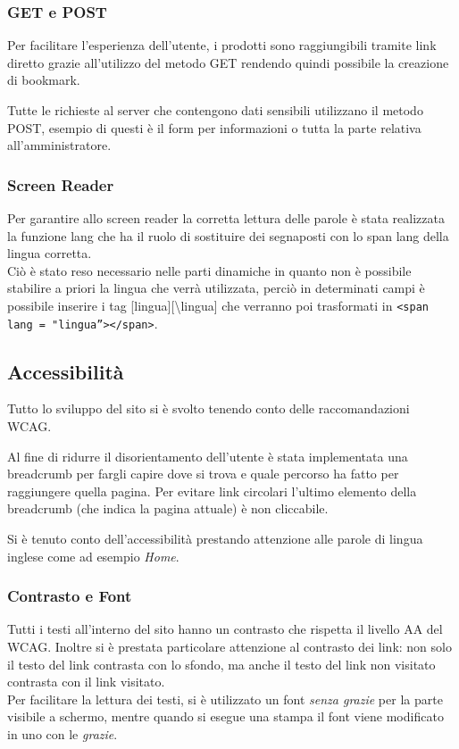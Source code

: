 \documentclass[a4paper, 11pt]{article}
\begin{document}
\subsubsection{GET e POST}
Per facilitare l’esperienza dell’utente, i prodotti sono raggiungibili tramite link diretto grazie all’utilizzo del metodo GET rendendo quindi possibile la creazione di bookmark. 

Tutte le richieste al server che contengono dati sensibili utilizzano il metodo POST, esempio di questi è il form per informazioni o tutta la parte relativa all’amministratore.

\subsubsection{Screen Reader}
Per garantire allo screen reader la corretta lettura delle parole è stata realizzata la funzione lang che ha il ruolo di sostituire dei segnaposti con lo span lang della lingua corretta. \\
Ciò è stato reso necessario nelle parti dinamiche in quanto non è possibile stabilire a priori la lingua che verrà utilizzata, perciò in determinati campi è possibile inserire i tag [lingua][\textbackslash lingua] che verranno poi trasformati in \texttt{<span lang =  "lingua”></span>}.

\pagebreak

\subsection{Accessibilità}

Tutto lo sviluppo del sito si è svolto tenendo conto delle raccomandazioni WCAG. 

Al fine di ridurre il disorientamento dell’utente è stata implementata una breadcrumb per fargli capire dove si trova e quale percorso ha fatto per raggiungere quella pagina. 
Per evitare link circolari l’ultimo elemento della breadcrumb (che indica la pagina attuale) è non cliccabile.

Si è tenuto conto dell'accessibilità prestando attenzione alle parole di lingua inglese come ad esempio \textit{Home}.

\subsubsection{Contrasto e Font}

Tutti i testi all'interno del sito hanno un contrasto che rispetta il livello AA del WCAG. Inoltre si è prestata particolare attenzione al contrasto dei link: non solo il testo del link contrasta con lo sfondo, ma anche il testo del link non visitato contrasta con il link visitato. \\
Per facilitare la lettura dei testi, si è utilizzato un font \textit{senza grazie} per la parte visibile a schermo, mentre quando si esegue una stampa il font viene modificato in uno con le \textit{grazie}. 
\end{document}

